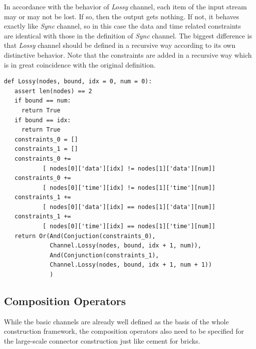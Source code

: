 \documentclass[3p,times]{elsarticle}
\begin{document}
In accordance with the behavior of \emph{Lossy} channel, each item of the input stream may or may not be lost. If so, then the output gets nothing. If not, it behaves exactly like \emph{Sync} channel, so in this case the data and time related constraints are identical with those in the definition of \emph{Sync} channel. The biggest difference is that \emph{Lossy} channel should be defined in a recursive way according to its own distinctive behavior. Note that the constraints are added in a recursive way which is in great coincidence with the original definition.
\begin{lstlisting}[frame=single]
def Lossy(nodes, bound, idx = 0, num = 0):
   assert len(nodes) == 2
   if bound == num:
     return True
   if bound == idx:
     return True
   constraints_0 = []
   constraints_1 = []
   constraints_0 +=
           [ nodes[0]['data'][idx] != nodes[1]['data'][num]]
   constraints_0 +=
           [ nodes[0]['time'][idx] != nodes[1]['time'][num]]
   constraints_1 +=
           [ nodes[0]['data'][idx] == nodes[1]['data'][num]]
   constraints_1 +=
           [ nodes[0]['time'][idx] == nodes[1]['time'][num]]
   return Or(And(Conjuction(constraints_0),
             Channel.Lossy(nodes, bound, idx + 1, num)),
             And(Conjunction(constraints_1),
             Channel.Lossy(nodes, bound, idx + 1, num + 1))
             )
\end{lstlisting}
\subsection{Composition Operators}
While the basic channels are already well defined as the basis of the whole construction framework, the composition operators also need to be specified for the large-scale connector construction just like cement for bricks.
\end{document}
